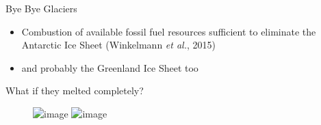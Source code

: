 \documentclass[hide notes,intlimits]{beamer}
\begin{document}
  

  {
} 

\begin{frame}{Bye Bye Glaciers}
    \begin{itemize}
      \item Combustion of available fossil fuel resources sufficient to eliminate the Antarctic Ice Sheet (Winkelmann \emph{et al.}, 2015)
      \item and probably the  Greenland Ice Sheet too
    \end{itemize}
\end{frame}

  {
} 

\begin{frame}{What if they melted completely?}
  \begin{figure}
    \includegraphics<1>[width=\textwidth]{sea-level-potential-simple-01}
    \includegraphics<2>[width=\textwidth]{sea-level-potential-01}
  \end{figure}
\end{frame}


  {
} 
\end{document}
